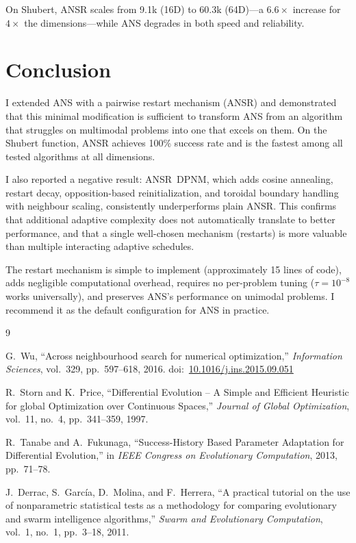 \documentclass[11pt,a4paper]{article}
\begin{document}
On Shubert, ANSR scales from 9.1k (16D) to 60.3k (64D)---a $6.6\times$ increase for $4\times$ the dimensions---while ANS degrades in both speed and reliability.

\section{Conclusion}

I extended ANS with a pairwise restart mechanism (ANSR) and demonstrated that this minimal modification is sufficient to transform ANS from an algorithm that struggles on multimodal problems into one that excels on them. On the Shubert function, ANSR achieves 100\% success rate and is the fastest among all tested algorithms at all dimensions.

I also reported a negative result: ANSR~DPNM, which adds cosine annealing, restart decay, opposition-based reinitialization, and toroidal boundary handling with neighbour scaling, consistently underperforms plain ANSR. This confirms that additional adaptive complexity does not automatically translate to better performance, and that a single well-chosen mechanism (restarts) is more valuable than multiple interacting adaptive schedules.

The restart mechanism is simple to implement (approximately 15 lines of code), adds negligible computational overhead, requires no per-problem tuning ($\tau = 10^{-8}$ works universally), and preserves ANS's performance on unimodal problems. I recommend it as the default configuration for ANS in practice.


\begin{thebibliography}{9}

G.~Wu,
``Across neighbourhood search for numerical optimization,''
\emph{Information Sciences}, vol.~329, pp.~597--618, 2016.
doi:~\href{https://doi.org/10.1016/j.ins.2015.09.051}{10.1016/j.ins.2015.09.051}

R.~Storn and K.~Price,
``Differential Evolution -- A Simple and Efficient Heuristic for global Optimization over Continuous Spaces,''
\emph{Journal of Global Optimization}, vol.~11, no.~4, pp.~341--359, 1997.

R.~Tanabe and A.~Fukunaga,
``Success-History Based Parameter Adaptation for Differential Evolution,''
in \emph{IEEE Congress on Evolutionary Computation}, 2013, pp.~71--78.

J.~Derrac, S.~Garc{\'i}a, D.~Molina, and F.~Herrera,
``A practical tutorial on the use of nonparametric statistical tests as a methodology for comparing evolutionary and swarm intelligence algorithms,''
\emph{Swarm and Evolutionary Computation}, vol.~1, no.~1, pp.~3--18, 2011.

\end{thebibliography}
\end{document}
